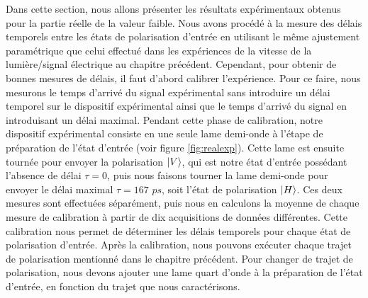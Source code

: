 \begin{onehalfspace}
    Dans cette section, nous allons présenter les résultats expérimentaux
    obtenus pour la partie réelle de la valeur faible.
    Nous avons procédé à la mesure des délais temporels entre les
    états de polarisation d'entrée en utilisant le même ajustement
    paramétrique que celui effectué dans les expériences de la vitesse
    de la lumière/signal électrique au chapitre précédent.
    Cependant, pour obtenir de bonnes mesures de délais, il faut d'abord calibrer l'expérience. Pour ce faire, 
    nous mesurons le temps d'arrivé du signal expérimental sans introduire
    un délai temporel sur le dispositif expérimental ainsi que le temps 
    d'arrivé du signal en introduisant un délai maximal. 
    Pendant cette phase de calibration, notre dispositif 
    expérimental consiste en une seule lame 
    demi-onde à l'étape de préparation de l'état d'entrée (voir figure  
    \ref{fig:realexp}). Cette lame est ensuite tournée pour envoyer la 
    polarisation $\ket{V}$, qui est notre état d’entrée possédant l'absence 
    de délai $\tau = 0$,
    puis nous faisons tourner la lame demi-onde pour envoyer le délai
    maximal $\tau = 167$ $ps$, soit l’état de polarisation $\ket{H}$. Ces deux mesures 
    sont effectuées séparément, puis nous en calculons la moyenne
    de chaque mesure de calibration à partir
    de dix acquisitions de données différentes. Cette calibration
    nous permet de déterminer les délais temporels pour chaque état de
    polarisation d'entrée. Après la calibration, nous pouvons exécuter chaque 
    trajet de polarisation mentionné dans le chapitre précédent. Pour 
    changer de trajet de polarisation, nous devons ajouter une lame 
    quart d’onde à la préparation de l’état d’entrée, en fonction du 
    trajet que nous caractérisons.
    

\end{onehalfspace}